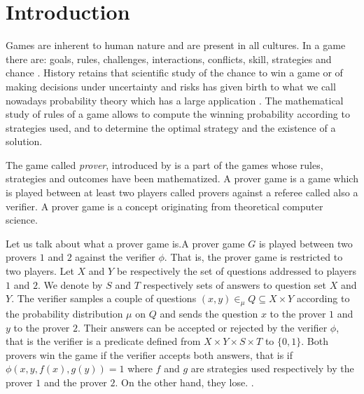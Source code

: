 \chapter{Introduction}

Games are inherent to  human nature and are present in all cultures.  In a game there are: goals, rules, challenges, interactions, conflicts, skill, strategies and chance \citep{mcgonigal2011reality, crawford1984art}.
History retains
that scientific study of the chance to win a game or of making decisions under uncertainty and risks has given birth to what we call nowadays probability theory which has a large application
\citep{freund2012introduction}. The mathematical study of rules of a game allows to compute the winning probability according to strategies used, and to determine the optimal strategy and the existence of a solution.

The game called \emph{prover},
introduced by \cite*{ben1988multi} is a part
of the games whose rules, strategies and outcomes  have been mathematized. A prover game is a game which is played between at least two players called provers against a referee called also a verifier. A prover game is a concept originating from theoretical computer science.  

Let us talk about what a prover game is.A prover game $G$ is played between two provers $1$ and $2$ against the verifier $\phi$. That is, the prover game is restricted to  two players.  Let $X$ and $Y$ be respectively the set of questions addressed to players $1$ and $2.$ We denote by $S$ and $T$ respectively  sets of answers to question set $X$ and $Y$. The verifier samples a couple of questions $(x,y) \in_{\mu} Q \subseteq X \times Y$ according to the  probability distribution $\mu$ on $Q$ and sends the question $x$ to the prover $1$ and $y$ to the prover $2.$ Their answers can be accepted or rejected by the verifier $\phi$, that is the verifier is a predicate defined from $X \times Y \times S \times T$ to $\{0,1\}.$ Both  provers win the game if the verifier accepts both answers, that is if $\phi (x,y,f(x),g(y))=1$ where $f$ and $g$ are  strategies used respectively by the prover $1$ and the prover $2.$ On the other hand, they lose.
.


